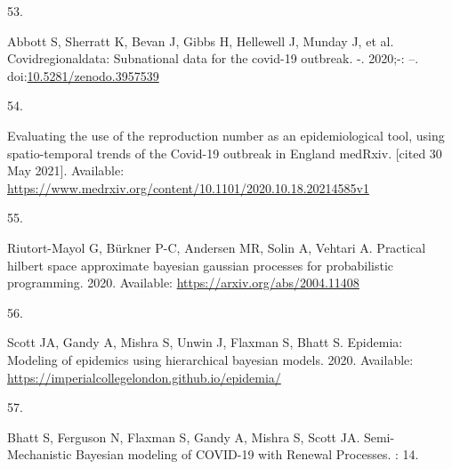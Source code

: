 \documentclass[10pt,letterpaper]{article}
\newlength{\cslhangindent}
\newlength{\csllabelwidth}
\newlength{\cslentryspacingunit} %
\newenvironment{CSLReferences}[2] %
 {%
  \setlength{\parindent}{0pt}
  \ifodd #1
  \let\oldpar\par
  \def\par{\hangindent=\cslhangindent\oldpar}
  \fi
  \setlength{\parskip}{#2\cslentryspacingunit}
 }%
 {}
\newcommand{\CSLLeftMargin}[1]{\parbox[t]{\csllabelwidth}{#1}}
\newcommand{\CSLRightInline}[1]{\parbox[t]{\linewidth - \csllabelwidth}{#1}\break}
\begin{document}
\begin{CSLReferences}{0}{0}
\leavevmode{}%
\CSLLeftMargin{53. }
\CSLRightInline{Abbott S, Sherratt K, Bevan J, Gibbs H, Hellewell J,
Munday J, et al. Covidregionaldata: Subnational data for the covid-19
outbreak. -. 2020;-: --.
doi:\href{https://doi.org/10.5281/zenodo.3957539}{10.5281/zenodo.3957539}}

\leavevmode{}%
\CSLLeftMargin{54. }
\CSLRightInline{Evaluating the use of the reproduction number as an
epidemiological tool, using spatio-temporal trends of the {Covid-19}
outbreak in {England} \textbar{} {medRxiv}. {[}cited 30 May 2021{]}.
Available:
\url{https://www.medrxiv.org/content/10.1101/2020.10.18.20214585v1}}

\leavevmode{}%
\CSLLeftMargin{55. }
\CSLRightInline{Riutort-Mayol G, Bürkner P-C, Andersen MR, Solin A,
Vehtari A. Practical hilbert space approximate bayesian gaussian
processes for probabilistic programming. 2020. Available:
\url{https://arxiv.org/abs/2004.11408}}

\leavevmode{}%
\CSLLeftMargin{56. }
\CSLRightInline{Scott JA, Gandy A, Mishra S, Unwin J, Flaxman S, Bhatt
S. Epidemia: Modeling of epidemics using hierarchical bayesian models.
2020. Available:
\url{https://imperialcollegelondon.github.io/epidemia/}}

\leavevmode{}%
\CSLLeftMargin{57. }
\CSLRightInline{Bhatt S, Ferguson N, Flaxman S, Gandy A, Mishra S, Scott
JA. Semi-{Mechanistic Bayesian} modeling of {COVID-19} with {Renewal
Processes}. : 14. }

\end{CSLReferences}

\nolinenumbers
\end{document}
